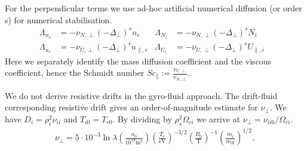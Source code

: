  For the perpendicular terms we use ad-hoc artificial numerical diffusion (or
 order s) for numerical stabilisation.
\begin{align}
\label{eq:perpdiffNU}
\Lambda_{n_e} &=  -\nu_{N,\perp}(-\Delta_\perp)^s n_e &
\Lambda_{N_i} &=  -\nu_{N,\perp}(-\Delta_\perp)^s N_i & \\
\Lambda_{u_e} &=  -\nu_{U,\perp}(-\Delta_\perp)^s u_{\parallel,e} &
\Lambda_{U_i} &=  -\nu_{U,\perp}(-\Delta_\perp)^s U_{\parallel,i}
\end{align}
Here we separately identify the mass diffusion coefficient and the viscous
coefficient, hence the Schmidt number \(\mathit{Sc}_\parallel:=
\frac{\nu_{U,\perp}}{\nu_{N,\perp}}\).

We do not derive resistive drifts in the gyro-fluid approach.
The drift-fluid corresponding resistive drift gives an order-of-magnitude estimate for $\nu_\perp$.
We have  $D_i = \rho_i^2 \nu_{ii}$ and $T_{i0} = T_{e0}$.
By dividing by $\rho_s^2 \Omega_{ci}$ we arrive at $\nu_\perp = \nu_{ii0}/\Omega_{ci}$.
\begin{align}
\nu_\perp =
5\cdot 10^{-3} \ln \lambda
\left(\frac{n_0}{10^{19}\text{m}^3}\right)
\left(\frac{T_e}{\text{eV}}\right)^{-3/2}
\left(\frac{B_0}{\text{T}}\right)^{-1}
\left(\frac{m_i}{m_H}\right)^{1/2},
\end{align}

